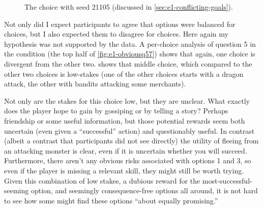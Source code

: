 \begin{figure}[!p]
\centering
{}
\caption[``Obvious'' choice 21105]{The \obv{} choice with seed 21105 (discussed in \cref{sec:e1-conflicting-goals}).}
  \label{fig:e1-seed-21105}
\end{figure}


Not only did I expect participants to agree that options were balanced for \dlm{} choices, but I also expected them to disagree for \obv{} choices.
%
Here again my hypothesis was not supported by the data.
%
A per-choice analysis of question 5 in the \obv{} condition (the top half of \cref{fig:e1-obviousq57}) shows that again, one choice is divergent from the other two.
%
 shows that middle choice, which compared to the other two \obv{} choices is low-stakes (one of the other choices starts with a dragon attack, the other with bandits attacking some merchants).



Not only are the stakes for this choice low, but they are unclear.
%
What exactly does the player hope to gain by gossiping or by telling a story?
%
Perhaps friendship or some useful information, but those potential rewards seem both uncertain (even given a ``successful'' action) and questionably useful.
%
In contrast (albeit a contrast that participants did not see directly) the utility of fleeing from an attacking monster is clear, even if it is uncertain whether you will succeed.
%
Furthermore, there aren't any obvious risks associated with options 1 and 3, so even if the player is missing a relevant skill, they might still be worth trying.
%
Given this combination of low stakes, a dubious reward for the most-successful-seeming option, and seemingly consequence-free options all around, it is not hard to see how some might find these options ``about equally promising.''



